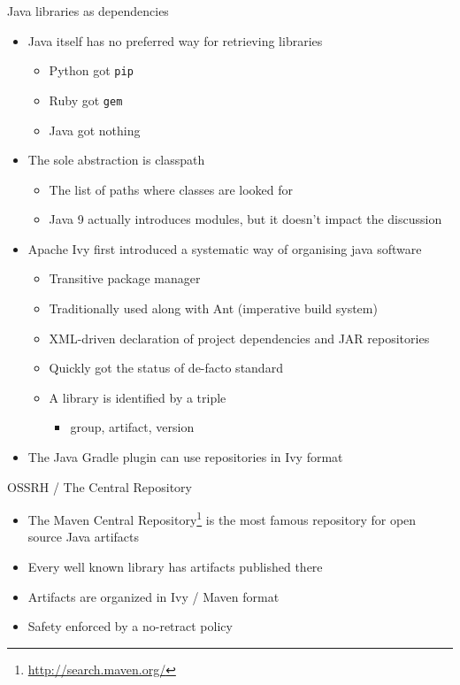 \documentclass[presentation]{beamer}
\begin{document}
\begin{frame}[fragile]{Java libraries as dependencies}
    \begin{itemize}
        \item Java itself has no preferred way for retrieving libraries
        \begin{itemize}
            \item Python got \texttt{pip}
            \item Ruby got \texttt{gem}
            \item Java got nothing
        \end{itemize}
        \item The sole abstraction is classpath
        \begin{itemize}
            \item The list of paths where classes are looked for
            \item Java 9 actually introduces modules, but it doesn't impact the discussion
        \end{itemize}
        \item Apache Ivy first introduced a systematic way of organising java software
        \begin{itemize}
            \item Transitive package manager
            \item Traditionally used along with Ant (imperative build system)
            \item XML-driven declaration of project dependencies and JAR repositories
            \item Quickly got the status of de-facto standard
            \item A library is identified by a triple
            \begin{itemize}
                \item group, artifact, version
            \end{itemize}
        \end{itemize}
        \item The Java Gradle plugin can use repositories in Ivy format
    \end{itemize}
\end{frame}

\begin{frame}[fragile]{OSSRH / The Central Repository}
    \begin{itemize}
        \item The Maven Central Repository\footnote{\url{http://search.maven.org/}} is the most famous repository for open source Java artifacts
        \item Every well known library has artifacts published there
        \item Artifacts are organized in Ivy / Maven format
        \item Safety enforced by a no-retract policy
    \end{itemize}
\end{frame}
\end{document}
